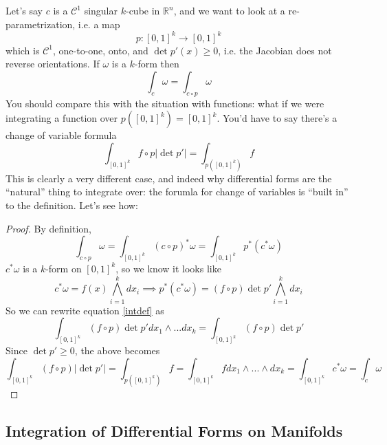 \documentclass{article}
\newcommand{\reals}[0]{\mathbb{R}}
\newcommand{\mc}[1]{\mathcal{#1}}
\begin{document}
Let's say \(c\) is a \(\mc{C}^1\) singular \(k\)-cube in \(\reals^n\), and we want to look at a re-parametrization, i.e. a map
\begin{equation}
  p : [0, 1]^k \to [0, 1]^k
\end{equation}
which is \(\mc{C}^1\), one-to-one, onto, and \(\det p'(x) \geq 0\), i.e. the Jacobian does not reverse orientations.
If \(\omega\) is a \(k\)-form then
\begin{equation}
  \int_c\omega = \int_{c \circ p}\omega
\end{equation}
You should compare this with the situation with functions: what if we were integrating a function over \(p([0, 1]^k) = [0, 1]^k\). You'd have to say there's a change of variable formula
\begin{equation}
  \int_{[0, 1]^k}f \circ p|\det p'| = \int_{p([0, 1]^k)}f
\end{equation}
This is clearly a very different case, and indeed why differential forms are the ``natural'' thing to integrate over: the forumla for change of variables is ``built in'' to the definition. Let's see how:
\begin{proof}
  By definition,
  \begin{equation}
    \int_{c \circ p}\omega = \int_{[0, 1]^k}(c \circ p)^*\omega = \int_{[0, 1]^k}p^*(c^*\omega)
    \label{intdef}
  \end{equation}
  \(c^*\omega\) is a \(k\)-form on \([0, 1]^k\), so we know it looks like
  \begin{equation}
    c^*\omega = f(x)\bigwedge_{i = 1}^kdx_i \implies p^*(c^*\omega) = (f \circ p)\det p' \bigwedge_{i = 1}^k dx_i
  \end{equation}
  So we can rewrite equation \ref{intdef} as
  \begin{equation}
    \int_{[0, 1]^k}(f \circ p)\det p'dx_1 \wedge ... dx_k = \int_{[0, 1]^k}(f \circ p)\det p'
  \end{equation}
  Since \(\det p' \geq 0\), the above becomes
  \begin{equation}
    \int_{[0, 1]^k}(f \circ p)|\det p'| = \int_{p([0, 1]^k)}f = \int_{[0, 1]^k}fdx_1 \wedge ... \wedge dx_k = \int_{[0, 1]^k}c^*\omega = \int_c\omega
  \end{equation}

\end{proof}

\subsection{Integration of Differential Forms on Manifolds}
\end{document}
